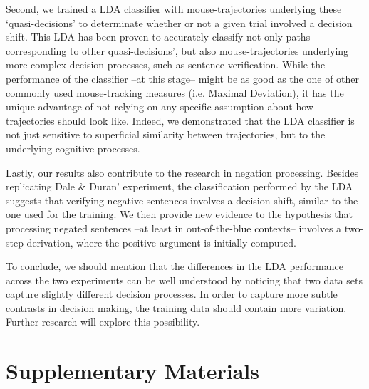 \documentclass{article}
\begin{document}
Second, we trained a LDA classifier with mouse-trajectories underlying these `quasi-decisions' to determinate whether or not a given trial involved a decision shift. 
This LDA has been proven to accurately classify not only paths corresponding to other quasi-decisions', but also mouse-trajectories underlying more complex decision processes, such as sentence verification. While the performance of the classifier --at this stage-- might be as good as the one of other commonly used mouse-tracking measures (i.e. Maximal Deviation), it has the unique advantage of not relying on any specific assumption about how trajectories should look like. Indeed, we demonstrated that the LDA classifier is not just sensitive to superficial similarity between trajectories, but to the underlying cognitive processes. 

Lastly, our results also contribute to the research in negation processing. Besides replicating Dale \& Duran' experiment, the classification performed by the LDA suggests that verifying negative sentences involves a decision shift, similar to the one used for the training. We then provide new evidence to the hypothesis that processing negated sentences --at least in out-of-the-blue contexts-- involves a two-step derivation, where the positive argument is initially computed.  

%

To conclude, we should mention that the differences in the LDA performance across the two experiments can be well understood by noticing that two data sets capture slightly different decision processes. In order to capture more subtle contrasts in decision making, the training data should contain more variation. Further research will explore this possibility. 
    


\section{Supplementary Materials}


\end{document}
